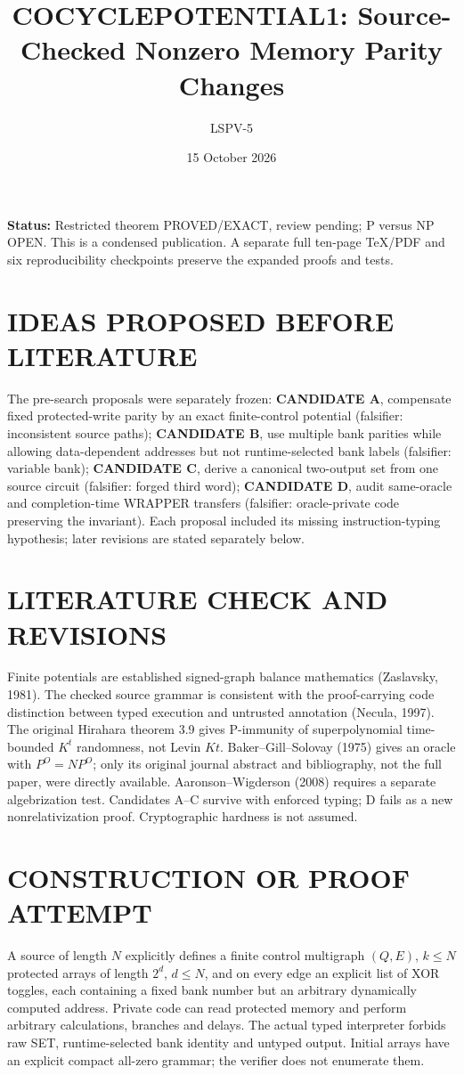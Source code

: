 \documentclass{article}
\title{COCYCLEPOTENTIAL1: Source-Checked Nonzero Memory Parity Changes}
\author{LSPV-5}
\date{15 October 2026}
\begin{document}
\maketitle
\noindent\textbf{Status:} Restricted theorem PROVED/EXACT, review pending; P versus NP OPEN. This is a condensed publication. A separate full ten-page TeX/PDF and six reproducibility checkpoints preserve the expanded proofs and tests.

\section{IDEAS PROPOSED BEFORE LITERATURE}
The pre-search proposals were separately frozen: \textbf{CANDIDATE A}, compensate fixed protected-write parity by an exact finite-control potential (falsifier: inconsistent source paths); \textbf{CANDIDATE B}, use multiple bank parities while allowing data-dependent addresses but not runtime-selected bank labels (falsifier: variable bank); \textbf{CANDIDATE C}, derive a canonical two-output set from one source circuit (falsifier: forged third word); \textbf{CANDIDATE D}, audit same-oracle and completion-time WRAPPER transfers (falsifier: oracle-private code preserving the invariant). Each proposal included its missing instruction-typing hypothesis; later revisions are stated separately below.

\section{LITERATURE CHECK AND REVISIONS}
Finite potentials are established signed-graph balance mathematics (Zaslavsky, 1981). The checked source grammar is consistent with the proof-carrying code distinction between typed execution and untrusted annotation (Necula, 1997). The original Hirahara theorem 3.9 gives P-immunity of superpolynomial time-bounded $K^t$ randomness, not Levin $Kt$. Baker--Gill--Solovay (1975) gives an oracle with $P^O=NP^O$; only its original journal abstract and bibliography, not the full paper, were directly available. Aaronson--Wigderson (2008) requires a separate algebrization test. Candidates A--C survive with enforced typing; D fails as a new nonrelativization proof. Cryptographic hardness is not assumed.

\section{CONSTRUCTION OR PROOF ATTEMPT}
A source of length $N$ explicitly defines a finite control multigraph $(Q,E)$, $k\le N$ protected arrays of length $2^d$, $d\le N$, and on every edge an explicit list of XOR toggles, each containing a fixed bank number but an arbitrary dynamically computed address. Private code can read protected memory and perform arbitrary calculations, branches and delays. The actual typed interpreter forbids raw SET, runtime-selected bank identity and untyped output. Initial arrays have an explicit compact all-zero grammar; the verifier does not enumerate them.
\end{document}
